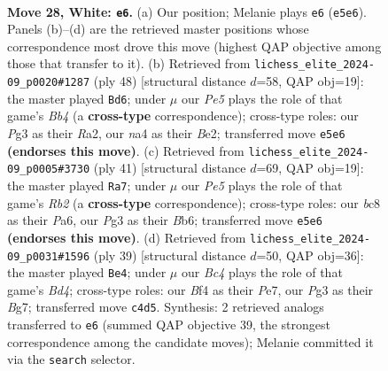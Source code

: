 \documentclass[11pt]{article}
\begin{document}
\clearpage

\begin{figure}[p]\centering
\begin{subfigure}{0.46\textwidth}\centering
\resizebox{\linewidth}{!}{%
\newchessgame
\chessboard[
  setfen={r1b4r/6k1/p1n3p1/p3PpNp/n1B2B2/P5P1/1P3P1P/RK1R4 w - - 3 28},
  showmover=false,
  pgfstyle=straightmove, color=movearrow, markmove={e5-e6}
]}
\caption{}
\end{subfigure}\hfill
\begin{subfigure}{0.46\textwidth}\centering
\resizebox{\linewidth}{!}{%
\newchessgame
\chessboard[
  setfen={r1r3k1/pp3ppp/2n5/3p1P2/PB1Pb1P1/2P5/R3B2P/5RK1 w - - 5 25},
  showmover=false,
  pgfstyle=straightmove, color=movearrow, markmove={b4-d6}
]}
\caption{}
\end{subfigure}
\\[4pt]
\begin{subfigure}{0.46\textwidth}\centering
\resizebox{\linewidth}{!}{%
\newchessgame
\chessboard[
  setfen={2b2rk1/1r3pp1/pb2p2p/1p2N3/1P2B3/6P1/P1PR1P1P/2K4R b - - 2 21},
  showmover=false,
  pgfstyle=straightmove, color=movearrow, markmove={b7-a7}
]}
\caption{}
\end{subfigure}\hfill
\begin{subfigure}{0.46\textwidth}\centering
\resizebox{\linewidth}{!}{%
\newchessgame
\chessboard[
  setfen={1r2k2r/4p1bp/p4pp1/3b4/P1pP1PN1/2P5/3B2PP/R4RK1 b k - 1 20},
  showmover=false,
  pgfstyle=straightmove, color=movearrow, markmove={d5-e4}
]}
\caption{}
\end{subfigure}
\caption{\textbf{Move 28, White: \texttt{e6}.} (a) Our position; Melanie plays \texttt{e6} (\texttt{e5e6}). Panels (b)--(d) are the retrieved master positions whose correspondence most drove this move (highest QAP objective among those that transfer to it). (b) Retrieved from \texttt{lichess\_elite\_2024-09\_p0020\#1287} (ply 48) [structural distance $d$=58, QAP obj=19]: the master played \texttt{Bd6}; under $\mu$ our \emph{Pe5} plays the role of that game's \emph{Bb4} (a \textbf{cross-type} correspondence); cross-type roles: our \emph{P}g3 as their \emph{R}a2, our \emph{n}a4 as their \emph{B}e2; transferred move \texttt{e5e6} \textbf{(endorses this move)}. (c) Retrieved from \texttt{lichess\_elite\_2024-09\_p0005\#3730} (ply 41) [structural distance $d$=69, QAP obj=19]: the master played \texttt{Ra7}; under $\mu$ our \emph{Pe5} plays the role of that game's \emph{Rb2} (a \textbf{cross-type} correspondence); cross-type roles: our \emph{b}c8 as their \emph{P}a6, our \emph{P}g3 as their \emph{B}b6; transferred move \texttt{e5e6} \textbf{(endorses this move)}. (d) Retrieved from \texttt{lichess\_elite\_2024-09\_p0031\#1596} (ply 39) [structural distance $d$=50, QAP obj=36]: the master played \texttt{Be4}; under $\mu$ our \emph{Bc4} plays the role of that game's \emph{Bd4}; cross-type roles: our \emph{B}f4 as their \emph{P}e7, our \emph{P}g3 as their \emph{B}g7; transferred move \texttt{c4d5}. Synthesis: 2 retrieved analogs transferred to \texttt{e6} (summed QAP objective 39, the strongest correspondence among the candidate moves); Melanie committed it via the \texttt{search} selector.}
\label{fig:thought-m54}
\end{figure}
\end{document}
